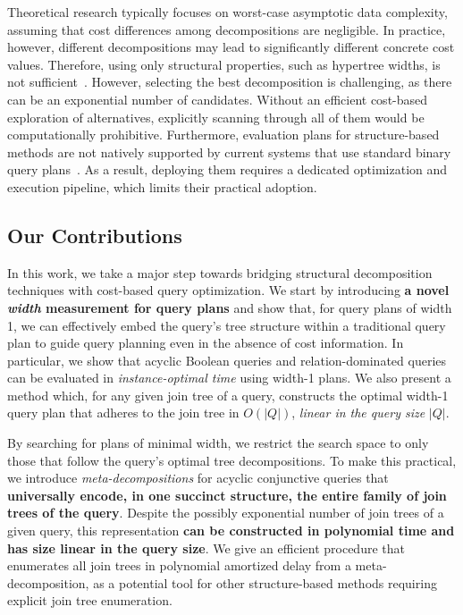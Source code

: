 Theoretical research typically focuses on worst-case asymptotic data complexity, assuming that cost differences among decompositions are negligible.  
In practice, however, different decompositions may lead to significantly different concrete cost values.
Therefore, using only structural properties, such as hypertree widths, is not sufficient~\cite{gottlob_reaching_2023}.
However, selecting the best decomposition is challenging, as there can be an exponential number of candidates. 
Without an efficient cost-based exploration of alternatives, explicitly scanning through all of them would be computationally prohibitive.
Furthermore, evaluation plans for structure-based methods are not natively supported by current systems that use standard binary query plans~\cite{koutris_database_2026,gottlob_reaching_2023}. As a result, deploying them requires a dedicated optimization and execution pipeline, which limits their practical adoption.

\subsection{Our Contributions}

In this work, we take a major step towards bridging structural decomposition techniques with cost-based query optimization.
We start by introducing \textbf{a novel \emph{width} measurement for query plans} 
and show that, for query plans of width 1, we can effectively embed the query’s tree structure within a traditional query plan to guide query planning even in the absence of cost information.  In particular, we show that acyclic Boolean queries and relation-dominated queries can be evaluated in \emph{instance-optimal time} using width-1 plans.  We also present a method which, for any given join tree of a query, constructs the optimal width-1 query plan that adheres to the join tree in $O(|Q|)$,  \emph{linear in the query size} $|Q|$.

By searching for plans of minimal width, we restrict the search space to only those that follow the query's optimal tree decompositions. To make this practical, we introduce \emph{meta-decompositions} for acyclic conjunctive queries that \textbf{universally encode, in one succinct structure, the entire family of join trees of the query}. Despite the possibly exponential number of join trees of a given query, this representation \textbf{can be constructed in polynomial time and has size linear in the query size}. We give an efficient procedure that enumerates all join trees in polynomial amortized delay from a meta-decomposition, as a potential tool for other structure-based methods requiring explicit join tree enumeration.



